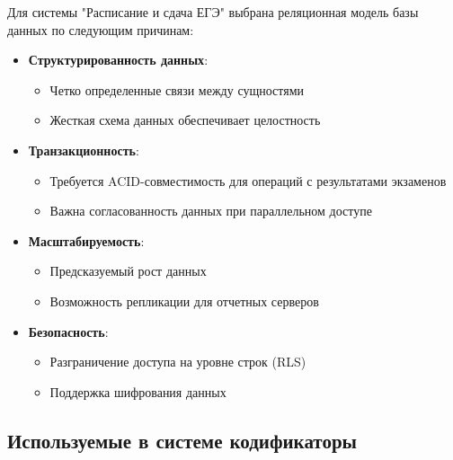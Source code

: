 \documentclass[a4paper]{article}
\begin{document}
Для системы "Расписание и сдача ЕГЭ" выбрана реляционная модель базы данных по следующим причинам:

\begin{itemize}
      \item \textbf{Структурированность данных}:
            \begin{itemize}
                  \item Четко определенные связи между сущностями
                  \item Жесткая схема данных обеспечивает целостность
            \end{itemize}

      \item \textbf{Транзакционность}:
            \begin{itemize}
                  \item Требуется ACID-совместимость для операций с результатами экзаменов
                  \item Важна согласованность данных при параллельном доступе
            \end{itemize}

      \item \textbf{Масштабируемость}:
            \begin{itemize}
                  \item Предсказуемый рост данных
                  \item Возможность репликации для отчетных серверов
            \end{itemize}

      \item \textbf{Безопасность}:
            \begin{itemize}
                  \item Разграничение доступа на уровне строк (RLS)
                  \item Поддержка шифрования данных
            \end{itemize}
\end{itemize}

\subsection{Используемые в системе кодификаторы}
\end{document}
